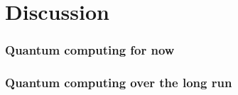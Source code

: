
\chapter{Discussion}
\label{ch:conclusie}



\subsection{Quantum computing for now}

\subsection{Quantum computing over the long run}


